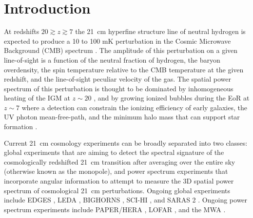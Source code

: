 \documentclass[twocolumn]{aastex61}
\begin{document}

\section{Introduction}

At redshifts $20 \gtrsim z \gtrsim 7$ the 21~cm hyperfine structure line of neutral hydrogen is
expected to produce a 10 to 100 mK perturbation in the Cosmic Microwave Background (CMB) spectrum
\citep{2006PhR...433..181F, 2012RPPh...75h6901P}. The amplitude of this perturbation on a given
line-of-sight is a function of the neutral fraction of hydrogen, the baryon overdensity, the spin
temperature relative to the CMB temperature at the given redshift, and the line-of-sight peculiar
velocity of the gas.  The spatial power spectrum of this perturbation is thought to be dominated by
inhomogeneous heating of the IGM at $z\sim 20$ \citep{2014MNRAS.437L..36F}, and by growing ionized
bubbles during the EoR at $z\sim 7$ where a detection can constrain the ionizing efficiency of early
galaxies, the UV photon mean-free-path, and the minimum halo mass that can support star formation
\citep{2015MNRAS.449.4246G}.

Current 21~cm cosmology experiments can be broadly separated into two classes: global experiments
that are aiming to detect the spectral signature of the cosmologically redshifted 21~cm transition
after averaging over the entire sky (otherwise known as the monopole), and power spectrum
experiments that incorporate angular information to attempt to measure the 3D spatial power spectrum
of cosmological 21~cm perturbations.  Ongoing global experiments include EDGES
\citep{2010Natur.468..796B, 2017ApJ...835...49M}, LEDA \citep{price_2017}, BIGHORNS
\citep{2015PASA...32....4S}, SCI-HI \citep{2014ApJ...782L...9V}, and SARAS 2
\citep{2017arXiv170306647S}.  Ongoing power spectrum experiments include PAPER/HERA
\citep{2015ApJ...809...61A, 2016arXiv160607473D}, LOFAR \citep{2017ApJ...838...65P}, and the MWA
\citep{2016ApJ...833..102B, 2016MNRAS.460.4320E}.
\end{document}
